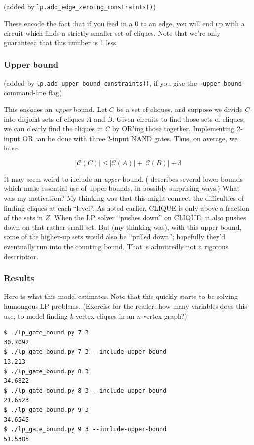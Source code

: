 \documentclass[12pt]{article}
\theoremstyle{definition}
\newcommand{\bigC}[0]{\mathcal{C}}
\begin{document}
(added by {\tt lp.add\_edge\_zeroing\_constraints()})

These encode the fact that if you feed in a 0 to an edge,
you will end up with a circuit which finds a strictly smaller
set of cliques. Note that we're only guaranteed that this
number is 1 less.

\subsubsection{Upper bound}

(added by {\tt lp.add\_upper\_bound\_constraints()}, if you give
the {\tt --upper-bound} command-line flag)

This encodes an {\em upper} bound.
Let $C$ be a set of cliques, and suppose we divide $C$ into
disjoint sets of cliques $A$ and $B$. Given circuits to
find those sets of cliques, we can clearly find the cliques
in $C$ by OR'ing those together. Implementing 2-input OR can be
done with three 2-input NAND gates. Thus, on average, we have

\[
|\bigC(C)| \le |\bigC(A)| + |\bigC(B)| + 3
\]

It may seem weird to include an {\em upper} bound.
(\cite{aaronson_pnp} describes several lower bounds which make
essential use of upper bounds, in possibly-surprising ways.)
 What was
my motivation? My thinking was that this might connect the difficulties
of finding cliques at each ``level''. As noted earlier, CLIQUE
is only above a fraction of the sets in $Z$. When the LP solver
``pushes down'' on CLIQUE, it also pushes down on that rather small
set. But (my thinking was), with this upper bound, some of the
higher-up sets would also be ``pulled down''; hopefully they'd
eventually run into the counting bound. That is admittedly
not a rigorous description.

\subsubsection{Results}

Here is what this model estimates. Note that this quickly starts
to be solving humongous LP problems. (Exercise for the reader:
how many variables does this use, to model finding $k$-vertex
cliques in an $n$-vertex graph?)

\begin{verbatim}
$ ./lp_gate_bound.py 7 3
30.7092
$ ./lp_gate_bound.py 7 3 --include-upper-bound
13.213
$ ./lp_gate_bound.py 8 3
34.6822
$ ./lp_gate_bound.py 8 3 --include-upper-bound
21.6523
$ ./lp_gate_bound.py 9 3
34.6545
$ ./lp_gate_bound.py 9 3 --include-upper-bound
51.5385
\end{verbatim}
\end{document}

